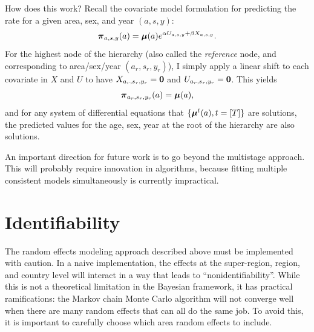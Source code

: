 How does this work?  Recall the covariate model formulation for
predicting the rate for a given area, sex, and year $(a,s,y)$:
\[
{\boldsymbol{\pi}}_{a,s,y}(a) = \boldsymbol{\mu}(a)e^{\alpha U_{a,s,y} + \beta X_{a,s,y}}. 
\]
For the highest node of the hierarchy (also called the
\emph{reference} node, and corresponding to area/sex/year $(a_r, s_r,
y_r)$), I simply apply a linear shift to each covariate in $X$ and $U$
to have $X_{{a_r},{s_r},{y_r}} = \mathbf{0}$ and $U_{a_r,s_r,y_r} = \mathbf{0}$.  This
yields \[ {\boldsymbol{\pi}}_{a_r,s_r,y_r}(a) = \boldsymbol{\mu}(a), \] and for any system
of differential equations that $\{\boldsymbol{\mu}^t(a), t=[T]\}$ are
solutions, the predicted values for the age, sex, year at the root of
the hierarchy are also solutions.

An important direction for future work is to go beyond the multistage
approach.  This will probably require innovation in algorithms,
because fitting multiple consistent models simultaneously is currently
impractical.

\section{Identifiability}
The random effects modeling approach described above must be
implemented with caution.  In a naive implementation, the effects at
the super-region, region, and country level will interact in a way
that leads to ``nonidentifiability''.  While this is not a
theoretical limitation in the Bayesian framework, it has practical
ramifications: the Markov chain Monte Carlo algorithm will not converge well when there
are many random effects that can all do the same job.  To avoid this,
it is important to carefully choose which area random effects to include.

